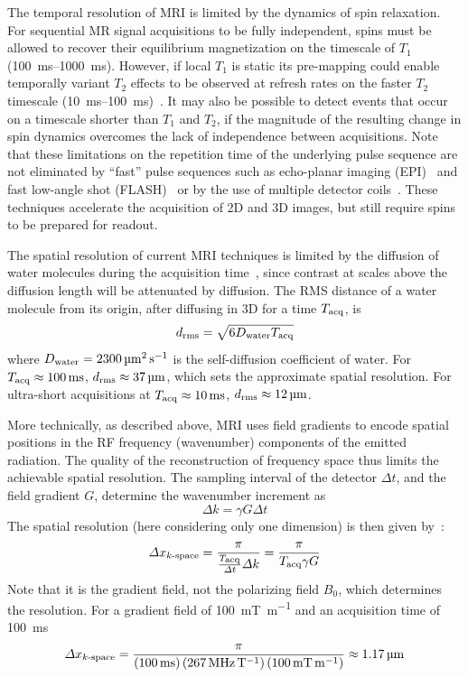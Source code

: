 The temporal resolution of MRI is limited by the dynamics of spin relaxation. For sequential MR signal acquisitions to be fully independent, spins must be allowed to recover their equilibrium magnetization on the timescale of $T_1$ (\SIrange{100}{1000}{\milli\second}).
However, if local $T_1$ is static its pre-mapping could enable temporally variant $T_2$ effects to be observed at refresh rates on the faster $T_2$ timescale (\SIrange{10}{100}{\milli\second})~\cite{deichmann95}.
It may also be possible to detect events that occur on a timescale shorter than $T_1$ and $T_2$, if the magnitude of the resulting change in spin dynamics overcomes the lack of independence between acquisitions.
Note that these limitations on the repetition time of the underlying pulse sequence are not eliminated by ``fast'' pulse sequences such as echo-planar imaging (EPI)~\cite{stehling91} and fast low-angle shot (FLASH)~\cite{haase86} or by the use of multiple detector coils~\cite{wiesinger06}.
These techniques accelerate the acquisition of 2D and 3D images, but still require spins to be prepared for readout.

The spatial resolution of current MRI techniques is limited by the diffusion of water molecules during the acquisition time~\cite{glover02}, since contrast at scales above the diffusion length will be attenuated by diffusion.
The RMS distance of a water molecule from its origin, after diffusing in 3D for a time $T_{\text{\scriptsize acq}}$, is
\[d_{\text{\scriptsize rms}} = \sqrt{6D_{\text{\scriptsize water}}T_{\text{\scriptsize acq}}}\]
where $D_{\text{\scriptsize water}}=\SI{2300}{\micro\meter\squared\per\second}$ is the self-diffusion coefficient of water.
For $T_{\text{\scriptsize acq}}\approx\SI{100}{\milli\second}$, $d_{\text{\scriptsize rms}}\approx\SI{37}{\micro\meter}$, which sets the approximate spatial resolution.
For ultra-short acquisitions at $T_{\text{\scriptsize acq}}\approx\SI{10}{\milli\second}$, $d_{\text{\scriptsize rms}}\approx\SI{12}{\micro\meter}$.

More technically, as described above, MRI uses field gradients to encode spatial positions in the RF frequency (wavenumber) components of the emitted radiation.
The quality of the reconstruction of frequency space thus limits the achievable spatial resolution.
The sampling interval of the detector $\Delta t$, and the field gradient $G$, determine the wavenumber increment as
\[\Delta k = \gamma G \Delta t\]
The spatial resolution (here considering only one dimension) is then given by~\cite{glover02}:
\[\Delta x_{\text{\scriptsize $k$-space}} = \frac{\pi}{\frac{T_{\text{\scriptsize acq}}}{\Delta t} \Delta k} = \frac{\pi}{T_{\text{\scriptsize acq}} \gamma G}\]
Note that it is the gradient field, not the polarizing field $B_0$, which determines the resolution. For a gradient field of \SI{100}{\milli\tesla\per\meter} and an acquisition time of \SI{100}{\milli\second}
\[\Delta x\sub{$k$-space} = \frac{\pi}{\left(\SI{100}{\milli\second}\right)\left(\SI{267}{\MHz\per\tesla}\right)\left(\SI{100}{\milli\tesla\per\meter}\right)}\approx \SI{1.17}{\micro\meter}\]


